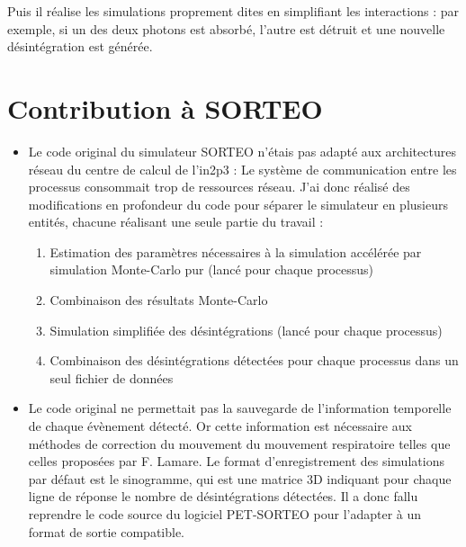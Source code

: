 Puis il réalise les simulations proprement dites en simplifiant les interactions : par exemple, si un des deux photons est absorbé, l'autre est détruit et une nouvelle désintégration est générée.

	\section{Contribution à SORTEO}

\begin{itemize}
    \item Le code original du simulateur SORTEO n'étais pas adapté aux architectures réseau du centre de calcul de l'in2p3 : Le système de communication entre les processus consommait trop de ressources réseau. J'ai donc réalisé des modifications en profondeur du code pour séparer le simulateur en plusieurs entités, chacune réalisant une seule partie du travail :

    \begin{enumerate}
        \item Estimation des paramètres nécessaires à la simulation accélérée par simulation Monte-Carlo pur (lancé pour chaque processus)
        \item Combinaison des résultats Monte-Carlo
        \item Simulation simplifiée des désintégrations (lancé pour chaque processus)
        \item Combinaison des désintégrations détectées pour chaque processus dans un seul fichier de données
    \end{enumerate}

    \item Le code original ne permettait pas la sauvegarde de l'information temporelle de chaque évènement détecté. Or cette information est nécessaire aux méthodes de correction du mouvement du mouvement respiratoire telles que celles proposées par F. Lamare. Le format d'enregistrement des simulations par défaut est le sinogramme, qui est une matrice 3D indiquant pour chaque ligne de réponse le nombre de désintégrations détectées. Il a donc fallu reprendre le code source du logiciel PET-SORTEO pour l'adapter à un format de sortie compatible. 
\end{itemize}
